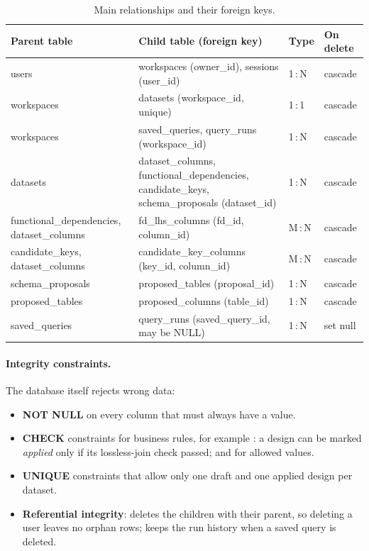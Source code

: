 \begin{table}[htbp]
\centering
\caption[Foreign keys]{Main relationships and their foreign keys.}
\label{tab:keys}
\footnotesize
\begin{tabularx}{\textwidth}{@{}l X l l@{}}
\toprule
\textbf{Parent table} & \textbf{Child table (foreign key)} & \textbf{Type} & \textbf{On delete} \\
\midrule
users & workspaces (owner\_id), sessions (user\_id) & 1\,:\,N & cascade \\
workspaces & datasets (workspace\_id, unique) & 1\,:\,1 & cascade \\
workspaces & saved\_queries, query\_runs (workspace\_id) & 1\,:\,N & cascade \\
datasets & dataset\_columns, functional\_dependencies, candidate\_keys, schema\_proposals (dataset\_id) & 1\,:\,N & cascade \\
functional\_dependencies, dataset\_columns & fd\_lhs\_columns (fd\_id, column\_id) & M\,:\,N & cascade \\
candidate\_keys, dataset\_columns & candidate\_key\_columns (key\_id, column\_id) & M\,:\,N & cascade \\
schema\_proposals & proposed\_tables (proposal\_id) & 1\,:\,N & cascade \\
proposed\_tables & proposed\_columns (table\_id) & 1\,:\,N & cascade \\
saved\_queries & query\_runs (saved\_query\_id, may be NULL) & 1\,:\,N & set null \\
\bottomrule
\end{tabularx}
\end{table}

\paragraph{Integrity constraints.} The database itself rejects wrong data:
\begin{itemize}
  \item \textbf{NOT NULL} on every column that must always have a value.
  \item \textbf{CHECK} constraints for business rules, for example
  : a design can be marked \emph{applied}
  only if its lossless-join check passed; and  for allowed values.
  \item \textbf{UNIQUE} constraints that allow only one draft and one applied design per dataset.
  \item \textbf{Referential integrity}:  deletes the children with their parent,
  so deleting a user leaves no orphan rows;  keeps the run history when a saved query is
  deleted.
\end{itemize}

